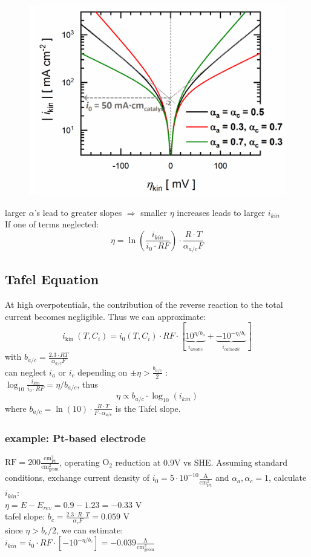 \documentclass[a4paper,10pt,landscape]{scrartcl}
\begin{document}
\begin{multicols*}{3}
\begin{figure}[H]
    \centering
    \includegraphics[width=.7\linewidth]{src/butler1.png}
\end{figure}
larger $\alpha$'s lead to greater slopes $\Rightarrow$ smaller $\eta$ increases leads to larger $i_{kin}$ \\
If one of terms neglected:
$$\eta=\ln\left(\frac{i_{kin}}{i_0\cdot RF}\right)\cdot\frac{R\cdot T}{\alpha_{a/c} F}$$

\subsection{Tafel Equation}
At high overpotentials, the contribution of the reverse reaction to the total current becomes negligible. Thus we can approximate:
$$
i_{\text {kin }}\left(T, C_i\right)=i_0\left(T, C_i\right) \cdot R F \cdot\left[\underbrace{10^{\eta / b_a}}_{i_{anodic}}+\underbrace{-10^{-\eta / b_c}}_{i_{cathodic}}\right]
$$
with $b_{a/c}=\frac{2.3\cdot RT}{\alpha_{a/c}F}$ \\
can neglect $i_{a}$ or $i_{c}$ depending on $\pm\eta>\frac{b_{a/c}}{2}$ : \\
$\log_{10}{\frac{i_{kin}}{i_0\cdot RF}}=\eta/b_{a/c}$, thus
$$\eta\propto b_{a/c}\cdot \log_{10}(i_{kin})$$
where $b_{a/c}=\ln(10)\cdot\frac{R\cdot T}{F\cdot \alpha_{a/c}}$ is the Tafel slope.
\subsubsection{example: Pt-based electrode}
$\mathrm{RF}=200\mathrm{\frac{cm_{Pt}^2}{cm^2_{geom}}}$, operating $\mathrm{O}_2$ reduction at 0.9V vs SHE. Assuming standard conditions, exchange current density of $i_0=5\cdot 10^{-10}\mathrm{\frac{A}{cm_{Pt}^2}}$ and $\alpha_a,\alpha_c=1$, calculate $i_{kin}$: \\
$\eta=E-E_{rev}=0.9-1.23=-0.33$ V\\
tafel slope: $b_c=\frac{2.3\cdot R\cdot T}{\alpha_c F}=0.059$ V \\
since $\eta>b_c/2$, we can estimate: \\
$i_{kin}=i_0\cdot RF\cdot [-10^{-\eta/b_c}]=-0.039  \mathrm{\frac{A}{cm_{geom}^2}}$


\end{multicols*}
\end{document}
